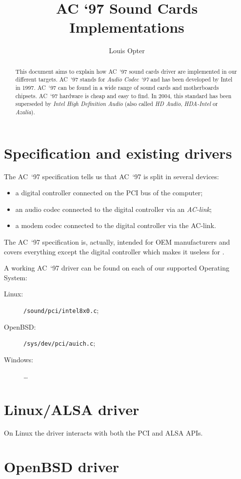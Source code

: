 \documentclass[a4paper,american]{rtxarticle}
\author{Louis Opter}
\title{AC `97 Sound Cards Implementations}
\begin{document}
\maketitle

\begin{abstract}
This document aims to explain how AC~`97 sound cards driver are implemented in
our different targets. AC~`97 stands for \emph{Audio Codec `97} and has been
developed by Intel in 1997. AC~`97 can be found in a wide range of sound cards
and motherboards chipsets. AC~`97 hardware is cheap and easy to find. In 2004,
this standard has been superseded by \emph{Intel High Definition Audio} (also
called \emph{HD Audio}, \emph{HDA-Intel} or \emph{Azalia}).
\end{abstract}

\section{Specification and existing drivers}

The AC~`97 specification tells us\cite[p. 11]{AC97spec} that AC~`97 is split in
several devices:
\begin{itemize}
\item a digital controller connected on the PCI bus of the computer;
\item an audio codec connected to the digital controller via an \emph{AC-link};
\item a modem codec connected to the digital controller via the AC-link.
\end{itemize}
The AC~`97 specification is, actually, intended for OEM manufacturers and covers
everything except the digital controller which makes it useless for \rtx.

A working AC~`97 driver can be found on each of our supported Operating System:
\begin{description}
\item[Linux:] \texttt{/sound/pci/intel8x0.c};
\item[OpenBSD:] \texttt{/sys/dev/pci/auich.c};
\item[Windows:] \ldots
\end{description}

\section{Linux/ALSA driver}

On Linux the driver interacts with both the PCI\cite[chap. 12]{LDD3} and
ALSA\cite{ALSADriver,ALSAAPI} APIs.

\section{OpenBSD driver}

\newpage

\rtxmaketitleblock

\rtxbibliography
\end{document}
